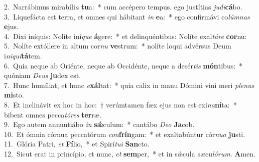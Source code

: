 {2.~}Narrábimus mirabíli\textit{a} \textbf{tu}a:~* cum accépero tempus, ego justítias \textit{ju}\textit{di}\textbf{cá}bo.\\
{3.~}Liquefácta est terra, et omnes qui hábitant \textit{in} \textbf{e}a:~* ego confirmávi co\textit{lúm}\textit{nas} \textbf{e}jus.\\
{4.~}Dixi iníquis: Nolíte iní\textit{que} \textbf{á}gere:~* et delinquéntibus: Nolíte exal\textit{tá}\textit{re} \textbf{cor}nu:\\
{5.~}Nolíte extóllere in altum cor\textit{nu} \textbf{ve}strum:~* nolíte loqui advérsus Deum i\textit{ni}\textit{qui}\textbf{tá}tem.\\
{6.~}Quia neque ab Oriénte, neque ab Occidénte, neque a desér\textit{tis} \textbf{món}tibus:~* quóniam \textit{De}\textit{us} \textbf{ju}dex est.\\
{7.~}Hunc humíliat, et hunc \textit{e}\textbf{xál}tat:~* quia calix in manu Dómini vini meri \textit{ple}\textit{nus} \textbf{mi}sto.\\
{8.~}Et inclinávit ex hoc in hoc:~† verúmtamen fæx ejus non est exi\textit{na}\textbf{ní}ta:~* bibent omnes pecca\textit{tó}\textit{res} \textbf{ter}ræ.\\
{9.~}Ego autem annuntiábo \textit{in} \textbf{sǽ}culum:~* cantábo \textit{De}\textit{o} \textbf{Ja}cob.\\
{10.~}Et ómnia córnua peccatórum \textit{con}\textbf{frín}gam:~* et exaltabúntur cór\textit{nu}\textit{a} \textbf{ju}sti.\\
{11.~}Glória Patri, \textit{et} \textbf{Fí}lio,~* et Spirí\textit{tu}\textit{i} \textbf{San}cto.\\
{12.~}Sicut erat in princípio, et nunc, \textit{et} \textbf{sem}per,~* et in sǽcula sæcu\textit{ló}\textit{rum}. \textbf{A}men.\\
